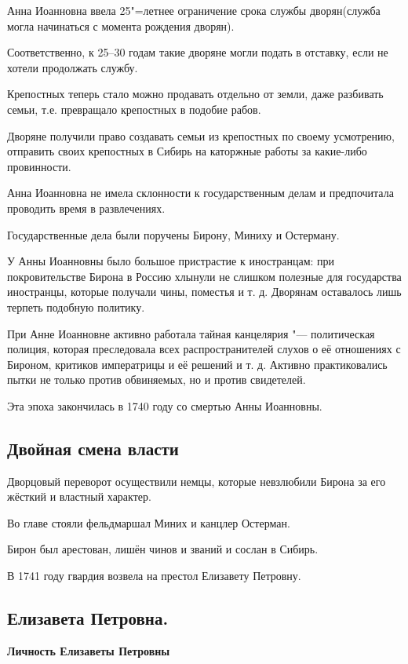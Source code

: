 Анна Иоанновна ввела 25"=летнее ограничение срока службы дворян(служба могла начинаться с момента рождения дворян). 

Соответственно, к 25--30 годам такие дворяне могли подать в отставку, если не хотели продолжать службу.

Крепостных теперь стало можно продавать отдельно от земли, даже разбивать семьи, т.е. превращало крепостных в подобие рабов.

Дворяне получили право создавать семьи из крепостных по своему усмотрению, отправить своих крепостных в Сибирь на каторжные работы за какие-либо провинности.

Анна Иоанновна не имела склонности к государственным делам и предпочитала проводить время в развлечениях. 

Государственные дела были поручены Бирону, Миниху и Остерману. 

У Анны Иоанновны было большое пристрастие к иностранцам: при покровительстве Бирона в Россию хлынули не слишком полезные для государства иностранцы, которые получали чины, поместья и т. д. Дворянам оставалось лишь терпеть подобную политику.

При Анне Иоанновне активно работала тайная канцелярия "--- политическая полиция, которая преследовала всех распространителей слухов о её отношениях с Бироном, критиков императрицы и её решений и т. д. Активно практиковались пытки не только против обвиняемых, но и против свидетелей.

Эта эпоха закончилась в 1740 году со смертью Анны Иоанновны. 

\subsection{Двойная смена власти}

Дворцовый переворот осуществили немцы, которые невзлюбили Бирона за его жёсткий и властный характер. 

Во главе стояли фельдмаршал Миних и канцлер Остерман. 

Бирон был арестован, лишён чинов и званий и сослан в Сибирь.  

В 1741  году гвардия возвела на престол Елизавету Петровну.

\subsection{Елизавета Петровна.}

\textbf{Личность Елизаветы Петровны}

